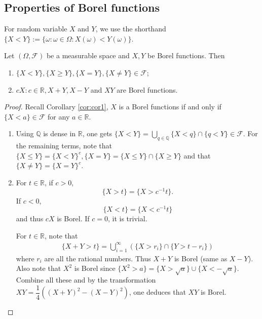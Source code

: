 \documentclass[11pt,singlecolumn, openany, citestyle=authoryear]{elegantbook}
\begin{document}
\begin{CJK}{UTF8}{gbsn}
\section{Properties of Borel functions}
For random variable $X$ and $Y$,
we use the shorthand $\{X<Y\}:=\{\omega:\omega\in \Omega: X(\omega)<Y(\omega)\}$.
\begin{lemma}
    Let $(\Omega, \mathcal{F})$ be a measurable space and $X,Y$ be Borel functions. Then
    \begin{enumerate}
        \item $\{X<Y\},\{X\geqslant Y\},\{X=Y\},\{X\neq Y\} \in \mathcal{F}$;
        \item $cX:c\in\mathbb{R}, X+Y,X-Y$ and $XY$ are Borel functions. 
    \end{enumerate}
\end{lemma}
\begin{proof}
    Recall Corollary \ref{cor:cor1}, $X$ is a Borel functions if and only if 
    $\{X<a\}\in\mathcal{F}$ for any $a \in \mathbb{R}$.
    \begin{enumerate}
        \item Using $\mathbb{Q}$ is dense in $\mathbb{R}$, one gets 
        $\{X<Y\}=\displaystyle \bigcup_{q \in \mathbb{Q}}\{X<q\}\cap \{q<Y\} \in 
        \mathcal{F}$. For the remaining terms, note that $\{X \leqslant Y\} = 
        \{X<Y\}^c, \{X=Y\}=\{X\leqslant Y\}\cap \{X\geqslant Y\}$ and that 
        $\{X\neq Y\}=\{X=Y\}^c$.
        \item For $t \in \mathbb{R}$, if $c>0$,
        $$
        \{X>t\}=\{X>c^{-1}t\}.
        $$
        If $c<0$,
        $$
        \{X<t\}=\{X<c^{-1}t\}
        $$
        and thus $cX$ is Borel. If $c=0$, it is trivial.
        
        For $t \in \mathbb{R}$, note that 
            \begin{align*}
                \{X+Y>t\} =\bigcup_{i=1}^\infty (\{X>r_i\}\cap \{Y>t-r_i\})
            \end{align*}
        where $r_i$ are all the rational numbers. Thus $X+Y$ is Borel (same as $X-Y$).
        Also note that 
        $X^2$ is Borel since $\{X^2 > a\} = \{X>\sqrt{a}\}\cup \{X<-\sqrt{a}\}$.
        Combine all these and by the transformation 
        $XY = \dfrac{1}{4}((X+Y)^2 - (X-Y)^2)$, one deduces that $XY$ is Borel.
    \end{enumerate}
\end{proof}


\end{CJK}
\end{document}
